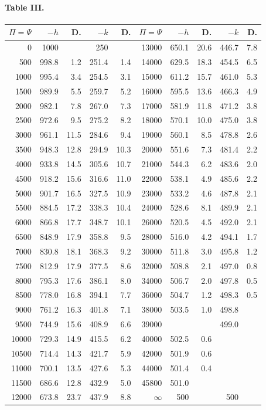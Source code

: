\documentclass[11pt,a4paper]{article}
\begin{document}
\paragraph*{Table III.}

\begin{center}
\begin{tabular}{|r|r|r|r|r||r|r|r|r|r|}
\hline
$\Pi = \Psi$ & $-h$ & D. & $-k$ & D. & $\Pi = \Psi$ & $-h$ & D. & $-k$ & D. \\\hline
0 & 1000 & & 250 & & 13000 & 650.1 & 20.6 & 446.7 & 7.8 \\
500 & 998.8 & 1.2 & 251.4 & 1.4 & 14000 & 629.5 & 18.3 & 454.5 & 6.5 \\
1000 & 995.4 & 3.4 & 254.5 & 3.1 & 15000 & 611.2 & 15.7 & 461.0 & 5.3 \\
1500 & 989.9 & 5.5 & 259.7 & 5.2 & 16000 & 595.5 & 13.6 & 466.3 & 4.9 \\
2000 & 982.1 & 7.8 & 267.0 & 7.3 & 17000 & 581.9 & 11.8 & 471.2 & 3.8 \\
2500 & 972.6 & 9.5 & 275.2 & 8.2 & 18000 & 570.1 & 10.0 & 475.0 & 3.8 \\
3000 & 961.1 & 11.5 & 284.6 & 9.4 & 19000 & 560.1 & 8.5 & 478.8 & 2.6 \\
3500 & 948.3 & 12.8 & 294.9 & 10.3 & 20000 & 551.6 & 7.3 & 481.4 & 2.2 \\
4000 & 933.8 & 14.5 & 305.6 & 10.7 & 21000 & 544.3 & 6.2 & 483.6 & 2.0 \\
4500 & 918.2 & 15.6 & 316.6 & 11.0 & 22000 & 538.1 & 4.9 & 485.6 & 2.2 \\
5000 & 901.7 & 16.5 & 327.5 & 10.9 & 23000 & 533.2 & 4.6 & 487.8 & 2.1 \\
5500 & 884.5 & 17.2 & 338.3 & 10.4 & 24000 & 528.6 & 8.1 & 489.9 & 2.1 \\
6000 & 866.8 & 17.7 & 348.7 & 10.1 & 26000 & 520.5 & 4.5 & 492.0 & 2.1 \\
6500 & 848.9 & 17.9 & 358.8 & 9.5 & 28000 & 516.0 & 4.2 & 494.1 & 1.7 \\
7000 & 830.8 & 18.1 & 368.3 & 9.2 & 30000 & 511.8 & 3.0 & 495.8 & 1.2 \\
7500 & 812.9 & 17.9 & 377.5 & 8.6 & 32000 & 508.8 & 2.1 & 497.0 & 0.8 \\
8000 & 795.3 & 17.6 & 386.1 & 8.0 & 34000 & 506.7 & 2.0 & 497.8 & 0.5 \\
8500 & 778.0 & 16.8 & 394.1 & 7.7 & 36000 & 504.7 & 1.2 & 498.3 & 0.5 \\
9000 & 761.2 & 16.3 & 401.8 & 7.1 & 38000 & 503.5 & 1.0 & 498.8 & \\
9500 & 744.9 & 15.6 & 408.9 & 6.6 & 39000 & & & 499.0 & \\
10000 & 729.3 & 14.9 & 415.5 & 6.2 & 40000 & 502.5 & 0.6 & & \\
10500 & 714.4 & 14.3 & 421.7 & 5.9 & 42000 & 501.9 & 0.6 & & \\
11000 & 700.1 & 13.5 & 427.6 & 5.3 & 44000 & 501.4 & 0.4 & & \\
11500 & 686.6 & 12.8 & 432.9 & 5.0 & 45800 & 501.0 & & & \\
12000 & 673.8 & 23.7 & 437.9 & 8.8 & $\infty$ & 500 & & 500 & \\
\hline
\end{tabular}
\end{center}
\end{document}
